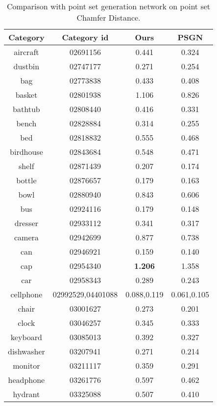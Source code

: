 \begin{table*}
	\centering
	\caption{Comparison with point set generation network on point set Chamfer Distance. }
	\begin{tabular}{c c c c}
		Category & Category id & Ours & PSGN\cite{PSGN} \\
		\hline
		aircraft & 02691156 & 0.441 & 0.324\\   
		dustbin & 02747177 & 0.271 & 0.254\\
		bag & 02773838  & 0.433 &  0.408\\
		basket & 02801938 & 1.106 & 0.826\\
		bathtub & 02808440 & 0.416 & 0.331\\
		bench & 02828884 & 0.314 & 0.255\\
		bed & 02818832 & 0.555 & 0.468\\
		birdhouse & 02843684 & 0.548 & 0.471\\
		shelf & 02871439 & 0.207 & 0.174\\
		bottle & 02876657 & 0.179 & 0.163\\
		bowl & 02880940 & 0.843 & 0.606\\
		bus & 02924116 & 0.179 & 0.148\\
		dresser & 02933112 & 0.341 & 0.317\\
		camera & 02942699 & 0.877 & 0.738\\
		can & 02946921 & 0.159 & 0.140\\
		cap & 02954340 & {\color{green} \textbf{1.206}} & 1.358\\
		car & 02958343 & 0.289 & 0.243\\
		cellphone & 02992529,04401088 & 0.088,0.119 & 0.061,0.105\\
		chair & 03001627 & 0.273 & 0.201\\
		clock & 03046257 & 0.345 & 0.333\\
		keyboard & 03085013 & 0.392 & 0.327\\
		dishwasher & 03207941 & 0.271 & 0.214\\
		monitor & 03211117 & 0.359 & 0.291\\
		headphone & 03261776 & 0.597 & 0.462\\
		hydrant & 03325088 & 0.507 & 0.410\\

\end{tabular}
\end{table*}
